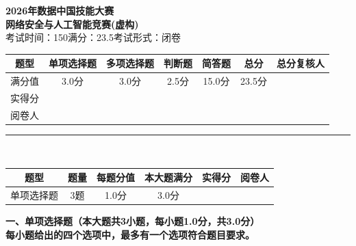 \documentclass[12pt,a4paper,onecolumn]{ctexart}
\newcommand{\subTitle}{网络安全与人工智能竞赛(虚构)}
\newcommand{\mainTitle}{2026年数据中国技能大赛}
\newcommand{\examtime}{150}
\newcommand{\examscore}{23.5}
\begin{document}
\begin{center}
    {\bfseries \mainTitle} \\
    \vspace{5pt}
    {\bfseries \subTitle} \\
    \vspace{5pt}
     考试时间：\examtime \quad 满分：\examscore \quad 考试形式：闭卷
\end{center}
\begin{center}
\begin{tabular}{|c|c|c|c|c|c|c|}
\hline
题型 & 单项选择题 & 多项选择题 & 判断题 & 简答题 & 总分 & 总分复核人 \\
\hline
满分值 & 3.0分 & 3.0分 & 2.5分 & 15.0分 & 23.5分 & \multirow{2}{*}{} \\
\hline
实得分 & & & & & & \\
\hline
阅卷人 & & & & & & \\
\hline
\end{tabular}
\end{center}
\hrule
\vspace{8pt}
\\%
\begin{flushleft}
\begin{tabular}{|c|c|c|c|c|c|}
\hline
题型 & 题量 & 每题分值 & 本大题满分 & 实得分 & 阅卷人 \\
\hline
单项选择题 & 3题 & 1.0分 & 3.0分 & & \\
\hline
\end{tabular}
\end{flushleft}
\noindent{}\bfseries{一、单项选择题（本大题共3小题，每小题1.0分，共3.0分）}\\
\vspace{2pt}
\noindent{}每小题给出的四个选项中，最多有一个选项符合题目要求。
\end{document}
